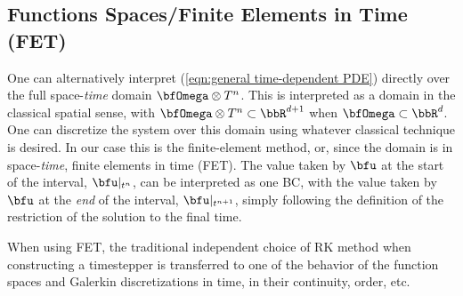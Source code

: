 \subsection*{Functions Spaces/Finite Elements in Time (FET)}\label{cha:FET}
    One can alternatively interpret (\ref{eqn:general time-dependent PDE}) directly over the full space-\emph{time} domain $\bfOmega\otimes T^{n}$. This is interpreted as a domain in the classical spatial sense, with $\bfOmega\otimes T^{n}  \subset  \bbR^{d + 1}$ when $\bfOmega  \subset  \bbR^{d}$. One can discretize the system over this domain using whatever classical technique is desired. In our case this is the finite-element method, or, since the domain is in space-\emph{time}, finite elements in time (FET). The value taken by $\bfu$ at the start of the interval, $\bfu|_{t^{n}}$, can be interpreted as one BC, with the value taken by $\bfu$ at the \emph{end} of the interval, $\bfu|_{t^{n + 1}}$, simply following the definition of the restriction of the solution to the final time.
    
    When using FET, the traditional independent choice of RK method when constructing a timestepper is transferred to one of the behavior of the function spaces and Galerkin discretizations in time, in their continuity, order, etc.
    
